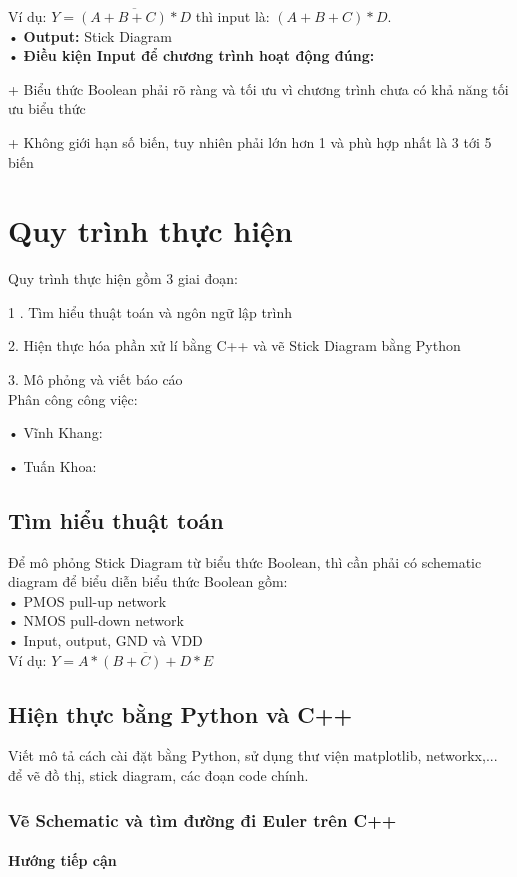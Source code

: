 \documentclass[a4paper,12pt]{article}
\begin{document}
Ví dụ: \( Y = \overline{(A + B + C) * D} \) thì input là: \( (A + B + C) * D \).\\
• \textbf{Output:} Stick Diagram\\
• \textbf{Điều kiện Input để chương trình hoạt động đúng:}

    + Biểu thức Boolean phải rõ ràng và tối ưu vì chương trình chưa có khả năng tối ưu biểu thức

    + Không giới hạn số biến, tuy nhiên phải lớn hơn 1 và phù hợp nhất là 3 tới 5 biến
\newpage
\section{Quy trình thực hiện}
Quy trình thực hiện gồm 3 giai đoạn:

1 . Tìm hiểu thuật toán và ngôn ngữ lập trình

2. Hiện thực hóa phần xử lí bằng C++ và vẽ Stick Diagram bằng Python

3. Mô phỏng và viết báo cáo\\
Phân công công việc:

• Vĩnh Khang:

• Tuấn Khoa: 
\subsection{Tìm hiểu thuật toán}
Để mô phỏng Stick Diagram từ biểu thức Boolean, thì cần phải có schematic diagram để biểu diễn biểu thức Boolean gồm: \\
• PMOS pull-up network\\
• NMOS pull-down network\\
• Input, output, GND và VDD\\
Ví dụ: \( Y = \overline{A *(B + C) + D * E} \)
\subsection{Hiện thực bằng Python và C++}
Viết mô tả cách cài đặt bằng Python, sử dụng thư viện matplotlib, networkx,... để vẽ đồ thị, stick diagram, các đoạn code chính.
\subsubsection{Vẽ Schematic và tìm đường đi Euler trên C++}
\paragraph{Hướng tiếp cận}
\end{document}
